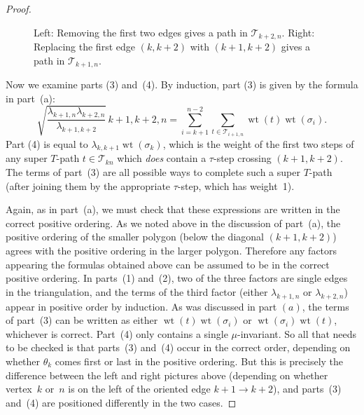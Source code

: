 \documentclass[11pt]{article}
\numberwithin{equation}{section}
\numberwithin{equation}{section}
\DeclareMathOperator{\wt}{wt}
\begin{document}
\begin{proof}
\begin{figure}[h]

 \caption{{Left:} Removing the first two edges gives a path in $\mathcal{T}_{k+2,n}$.
 {Right:} Replacing the first edge $(k,k+2)$ with $(k+1,k+2)$ gives a path in $\mathcal{T}_{k+1,n}$.} \label{fig:zigzag_cases}
 \end{figure}

 Now we examine parts (3) and~(4). By induction, part (3) is given by the formula in part~(a):
 \[
 \sqrt{\frac{\lambda_{k+1,n} \lambda_{k+2,n}}{\lambda_{k+1,k+2}}}\, \boxed{k+1,k+2,n}
 = \sum_{i=k+1}^{n-2} \sum_{t \in \mathcal{T}_{i+1,n}} \wt(t) \wt(\sigma_i).
 \]
 Part (4) is equal to $\lambda_{k,k+1} \wt(\sigma_k)$, which is the weight of the first two steps of any super $T$-path $t \in \mathcal{T}_{kn}$ which \emph{does}
 contain a $\tau$-step crossing $(k+1,k+2)$. The terms of part~(3) are all possible ways to complete such a super $T$-path (after joining them by
 the appropriate $\tau$-step, which has weight~1).

 Again, as in part~(a), we must check that these expressions are written in the correct positive ordering. As we noted above
 in the discussion of part~(a), the positive ordering of the smaller polygon (below the diagonal $(k+1,k+2)$) agrees with
 the positive ordering in the larger polygon. Therefore any factors appearing the formulas obtained above can be assumed to be in
 the correct positive ordering. In parts~(1) and~(2), two of the three factors are single edges in the triangulation, and the terms of the third factor
 (either $\lambda_{k+1,n}$ or $\lambda_{k+2,n}$) appear in positive order by induction. As was discussed in part $(a)$, the terms of
 part~(3) can be written as either $\wt(t)\wt(\sigma_i)$ or $\wt(\sigma_i)\wt(t)$, whichever is correct. Part~(4) only contains a single $\mu$-invariant.
 So all that needs to be checked is that parts~(3) and~(4) occur in the correct order, depending on whether $\theta_k$ comes first or last
 in the positive ordering. But this is precisely the difference between the left and right pictures above (depending on whether vertex~$k$ or~$n$ is on the left of the oriented edge $k+1 \to k+2$), and parts~(3) and~(4) are positioned differently in the two cases.
\end{proof}
\end{document}
